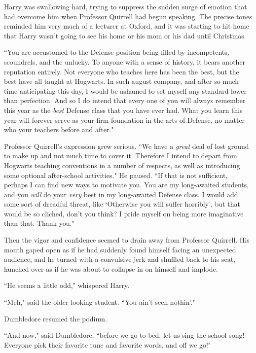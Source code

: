 Harry was swallowing hard, trying to suppress the sudden surge of emotion that had overcome him when Professor Quirrell had begun speaking. The precise tones reminded him very much of a lecturer at Oxford, and it was starting to hit home that Harry wasn't going to see his home or his mom or his dad until Christmas.

``You are accustomed to the Defense position being filled by incompetents, scoundrels, and the unlucky. To anyone with a sense of history, it bears another reputation entirely. Not everyone who teaches here has been the best, but the best have all taught at Hogwarts. In such august company, and after so much time anticipating this day, I would be ashamed to set myself any standard lower than perfection. And so I do intend that every one of you will always remember this year as the \emph{best} Defense class that you have ever had. What you learn this year will forever serve as your firm foundation in the arts of Defense, no matter who your teachers before and after."

Professor Quirrell's expression grew serious. ``We have a \emph{great} deal of lost ground to make up and not much time to cover it. Therefore I intend to depart from Hogwarts teaching conventions in a number of respects, as well as introducing some optional after-school activities." He paused. ``If that is not sufficient, perhaps I can find new ways to motivate you. You are my long-awaited students, and you \emph{will} do your \emph{very} best in my long-awaited Defense class. I would add some sort of dreadful threat, like `Otherwise you will suffer horribly', but that would be so cliched, don't you think? I pride myself on being more imaginative than that. Thank you."

Then the vigor and confidence seemed to drain away from Professor Quirrell. His mouth gaped open as if he had suddenly found himself facing an unexpected audience, and he turned with a convulsive jerk and shuffled back to his seat, hunched over as if he was about to collapse in on himself and implode.

``He seems a little odd," whispered Harry.

``Meh," said the older-looking student. ``You ain't seen nothin'."

Dumbledore resumed the podium.

``And now," said Dumbledore, ``before we go to bed, let us sing the school song! Everyone pick their favorite tune and favorite words, and off we go!"


